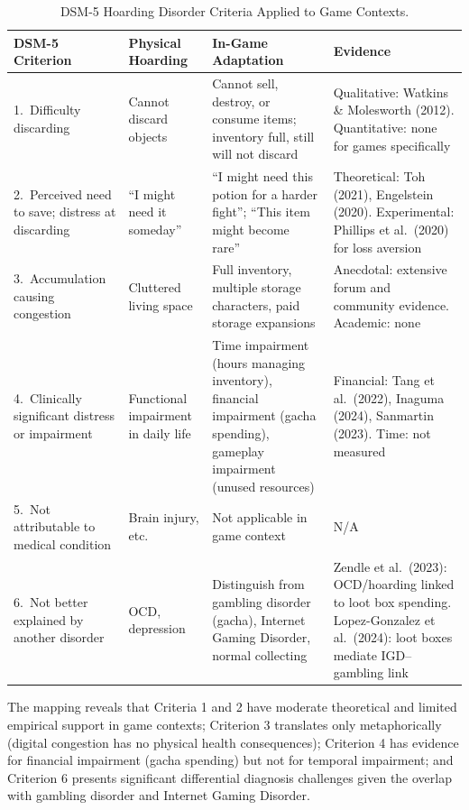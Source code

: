 \documentclass[12pt]{article}
\begin{document}
\begin{table}[ht]
\centering
\caption{DSM-5 Hoarding Disorder Criteria Applied to Game Contexts.}
\small
\begin{tabular}{p{2.5cm}p{2.5cm}p{3.5cm}p{4.5cm}}
\toprule
DSM-5 Criterion & Physical Hoarding & In-Game Adaptation & Evidence \\
\midrule
1.\ Difficulty discarding & Cannot discard objects & Cannot sell, destroy, or consume items; inventory full, still will not discard & Qualitative: Watkins \& Molesworth (2012). Quantitative: none for games specifically \\
2.\ Perceived need to save; distress at discarding & ``I might need it someday'' & ``I might need this potion for a harder fight''; ``This item might become rare'' & Theoretical: Toh (2021), Engelstein (2020). Experimental: Phillips et al.\ (2020) for loss aversion \\
3.\ Accumulation causing congestion & Cluttered living space & Full inventory, multiple storage characters, paid storage expansions & Anecdotal: extensive forum and community evidence. Academic: none \\
4.\ Clinically significant distress or impairment & Functional impairment in daily life & Time impairment (hours managing inventory), financial impairment (gacha spending), gameplay impairment (unused resources) & Financial: Tang et al.\ (2022), Inaguma (2024), Sanmartin (2023). Time: not measured \\
5.\ Not attributable to medical condition & Brain injury, etc. & Not applicable in game context & N/A \\
6.\ Not better explained by another disorder & OCD, depression & Distinguish from gambling disorder (gacha), Internet Gaming Disorder, normal collecting & Zendle et al.\ (2023): OCD/hoarding linked to loot box spending. Lopez-Gonzalez et al.\ (2024): loot boxes mediate IGD--gambling link \\
\bottomrule
\end{tabular}
\end{table}

The mapping reveals that Criteria 1 and 2 have moderate theoretical and limited empirical support in game contexts; Criterion 3 translates only metaphorically (digital congestion has no physical health consequences); Criterion 4 has evidence for financial impairment (gacha spending) but not for temporal impairment; and Criterion 6 presents significant differential diagnosis challenges given the overlap with gambling disorder and Internet Gaming Disorder.
\end{document}
